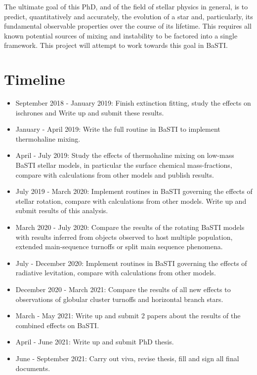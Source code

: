 \documentclass[12pt, a4paper]{report}
\begin{document}
The ultimate goal of this PhD, and of the field of stellar physics in general, is to predict, quantitatively and accurately, the evolution of a star and, particularly, its fundamental observable properties over the course of its lifetime. This requires all known potential sources of mixing and instability to be factored into a single framework. This project will attempt to work towards this goal in BaSTI.

\section{Timeline}
\begin{itemize}
\item September 2018 - January 2019: Finish extinction fitting, study the effects on ischrones and Write up and submit these results.
\item January - April 2019: Write the full routine in BaSTI to implement thermohaline mixing.
\item April - July 2019: Study the effects of thermohaline mixing on low-mass BaSTI stellar models, in particular the surface chemical mass-fractions, compare with calculations from other models and publish results.
\item July 2019 - March 2020: Implement routines in BaSTI governing the effects of stellar rotation, compare with calculations from other models. Write up and submit results of this analysis.
\item March 2020 - July 2020: Compare the results of the rotating BaSTI models with results inferred from objects observed to host multiple population, extended main-sequence turnoffs or split main sequence phenomena.
\item July - December 2020: Implement routines in BaSTI governing the effects of radiative levitation, compare with calculations from other models.
\item December 2020 - March 2021: Compare the results of all new effects to observations of globular cluster turnoffs and horizontal branch stars.
\item March - May 2021: Write up and submit 2 papers about the results of the combined effects on BaSTI.
\item April - June 2021: Write up and submit PhD thesis.
\item June - September 2021: Carry out viva, revise thesis, fill and sign all final documents.
\end{itemize}


\end{document}
